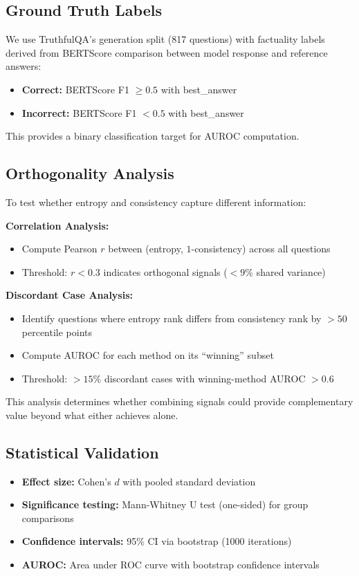 \subsection{Ground Truth Labels}

We use TruthfulQA's generation split (817 questions) with factuality labels derived from BERTScore comparison between model response and reference answers:

\begin{itemize}
    \item \textbf{Correct:} BERTScore F1 $\geq 0.5$ with best\_answer
    \item \textbf{Incorrect:} BERTScore F1 $< 0.5$ with best\_answer
\end{itemize}

This provides a binary classification target for AUROC computation.

\subsection{Orthogonality Analysis}

To test whether entropy and consistency capture different information:

\textbf{Correlation Analysis:}
\begin{itemize}
    \item Compute Pearson $r$ between (entropy, $1$-consistency) across all questions
    \item Threshold: $r < 0.3$ indicates orthogonal signals ($< 9\%$ shared variance)
\end{itemize}

\textbf{Discordant Case Analysis:}
\begin{itemize}
    \item Identify questions where entropy rank differs from consistency rank by $>50$ percentile points
    \item Compute AUROC for each method on its ``winning'' subset
    \item Threshold: $>15\%$ discordant cases with winning-method AUROC $>0.6$
\end{itemize}

This analysis determines whether combining signals could provide complementary value beyond what either achieves alone.

\subsection{Statistical Validation}

\begin{itemize}
    \item \textbf{Effect size:} Cohen's $d$ with pooled standard deviation
    \item \textbf{Significance testing:} Mann-Whitney U test (one-sided) for group comparisons
    \item \textbf{Confidence intervals:} 95\% CI via bootstrap (1000 iterations)
    \item \textbf{AUROC:} Area under ROC curve with bootstrap confidence intervals
\end{itemize}
